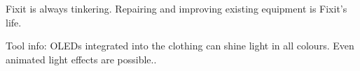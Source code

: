 \begin{npcBox}[title=Pioneer: Fixit]
    \begin{stressSection}
    \end{stressSection}
    \begin{tabularx}{\textwidth}{ XX }
    \end{tabularx}

    \begin{consequences}
    \item {}
    \item {}
    \item {}
    \end{consequences}

    \begin{npcDescription}

    Fixit is always tinkering. Repairing and improving existing equipment is Fixit's life.

    Tool info: OLEDs integrated into the clothing can shine light in all colours. Even animated light effects are possible..

    \end{npcDescription}

\end{npcBox}

\newpage


